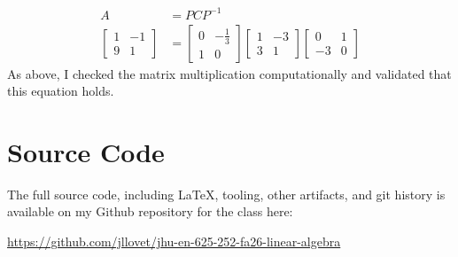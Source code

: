 \documentclass[10pt,letterpaper,final]{report}
\begin{document}
\begin{align*}
  A                 & = PCP^{-1}                               \\[1ex]
  \begin{bmatrix}
    1 & -1 \\
    9 & 1
  \end{bmatrix} & = \begin{bmatrix}
                      0 & -\frac{1}{3} \\
                      1 & 0
                    \end{bmatrix}\begin{bmatrix}
                                   1 & -3 \\
                                   3 & 1
                                 \end{bmatrix}\begin{bmatrix}
                                                0  & 1 \\
                                                -3 & 0
                                              \end{bmatrix}
\end{align*}
As above, I checked the matrix multiplication computationally and validated that this equation holds.

\pagebreak

\section*{Source Code}
The full source code, including LaTeX, tooling, other artifacts, and git history is available on my Github repository for the class here:
\begin{center}
  \url{https://github.com/jllovet/jhu-en-625-252-fa26-linear-algebra}
\end{center}

\printbibliography
\end{document}

